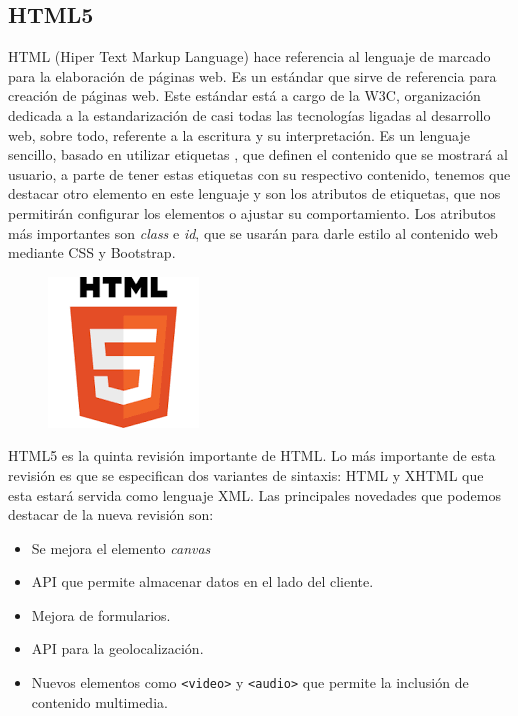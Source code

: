 \subsection{HTML5}
\label{sec:html}
HTML (Hiper Text Markup Language) hace referencia al lenguaje de marcado para la elaboración de páginas web. Es un estándar que sirve de referencia para creación de páginas web. Este estándar está a cargo de la W3C, organización dedicada a la estandarización de casi todas las tecnologías ligadas al desarrollo web, sobre todo, referente a la escritura y su interpretación. Es un lenguaje sencillo, basado en utilizar etiquetas , que definen el contenido que se mostrará al usuario, a parte de tener estas etiquetas con su respectivo contenido, tenemos  que destacar otro elemento en este lenguaje y son los atributos de etiquetas, que nos permitirán configurar los elementos o ajustar su comportamiento. Los atributos más importantes son \emph{class} e \emph{id}, que se usarán para darle estilo al contenido web mediante CSS y Bootstrap. \\
\begin{figure}[H]
    \centering
    \includegraphics[scale=0.8]{img/logo_html5.png}
\end{figure}
HTML5 es la quinta revisión importante de HTML. Lo más importante de esta revisión es que se especifican dos variantes de sintaxis: HTML y XHTML que esta estará servida como lenguaje XML. Las principales novedades que podemos destacar de la nueva revisión son:
\begin{itemize}
    \item Se mejora el elemento \emph{canvas}
    \item API que permite almacenar datos en el lado del cliente.
    \item Mejora de formularios.
    \item API para la geolocalización.
    \item Nuevos elementos como \texttt{<video>} y \texttt{<audio>} que permite la inclusión de contenido multimedia.
\end{itemize}


